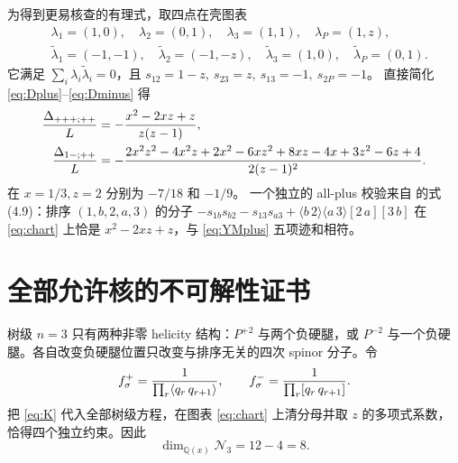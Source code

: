\documentclass[UTF8,a4paper,11pt]{ctexart}
\newcommand{\ag}[2]{\langle #1\,#2\rangle}
\newcommand{\sq}[2]{[#1\,#2]}
\begin{document}
为得到更易核查的有理式，取四点在壳图表
\begin{align}
&\lambda_1=(1,0),\quad\lambda_2=(0,1),\quad
\lambda_3=(1,1),\quad\lambda_P=(1,z),\nonumber\\
&\widetilde\lambda_1=(-1,-1),\quad
\widetilde\lambda_2=(-1,-z),\quad
\widetilde\lambda_3=(1,0),\quad
\widetilde\lambda_P=(0,1).
\label{eq:chart}
\end{align}
它满足 \(\sum_i\lambda_i\widetilde\lambda_i=0\)，且
\(s_{12}=1-z,\ s_{23}=z,\ s_{13}=-1,\ s_{2P}=-1\)。
直接简化 \eqref{eq:Dplus}--\eqref{eq:Dminus} 得
\begin{align}
{\Delta_{+++;++}\over L}
&=-{x^2-2xz+z\over z(z-1)},\label{eq:Dplusrat}\\
{\Delta_{1-;++}\over L}
&=-
{2x^2z^2-4x^2z+2x^2-6xz^2+8xz-4x
+3z^2-6z+4\over2(z-1)^2}.
\label{eq:Dminusrat}
\end{align}
在 \(x=1/3,z=2\) 分别为 \(-7/18\) 和 \(-1/9\)。
一个独立的 all-plus 校验来自 \cite{NPT} 的式 (4.9)：排序
\((1,b,2,a,3)\) 的分子
\(-s_{1b}s_{b2}-s_{13}s_{a3}
+\ag{b}{2}\ag{a}{3}\sq{2}{a}\sq{3}{b}\)
在 \eqref{eq:chart} 上恰是 \(x^2-2xz+z\)，与 \eqref{eq:YMplus} 五项迹和相符。

\section{全部允许核的不可解性证书}
树级 \(n=3\) 只有两种非零 helicity 结构：\(P^{+2}\) 与两个负硬腿，或 \(P^{-2}\) 与一个负硬腿。各自改变负硬腿位置只改变与排序无关的四次 spinor 分子。令
\[
f_\sigma^+={1\over\prod_r\ag{q_r}{q_{r+1}}},\qquad
f_\sigma^-={1\over\prod_r\sq{q_r}{q_{r+1}}}.
\]
把 \eqref{eq:K} 代入全部树级方程，在图表 \eqref{eq:chart} 上清分母并取 \(z\) 的多项式系数，恰得四个独立约束。因此
\begin{equation}
\dim_{\mathbb Q(x)}\mathcal N_3=12-4=8.
\label{eq:null}
\end{equation}
\end{document}
